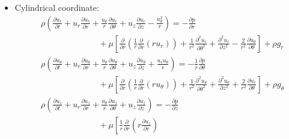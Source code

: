 \documentclass[../main.tex]{subfiles}
\begin{document}
\begin{itemize}
\begin{itemize}
\begin{align}
          \right) &= -\frac{\partial p}{\partial z} + \mu\left[
            \frac{\partial^2 u_z}{\partial x^2} + \frac{\partial^2 u_z}{\partial y^2} + \frac{\partial^2 u_z}{\partial z^2}
          \right] + \rho g_z
        \end{align}
      \item Cylindrical coordinate:
        \begin{align}
          &\rho\left(
            \frac{\partial u_r}{\partial t}  + u_r\frac{\partial u_r}{\partial r} + \frac{u_{\theta}}{r}\frac{\partial u_r}{\partial \theta} 
            + u_z\frac{\partial u_r}{\partial z} - \frac{u_{\theta}^2}{r}
          \right) = - \frac{\partial p}{\partial r} \nonumber\\
          &\phantom{\rho\left(\frac{\partial u_z}{\partial t}  + u_r\frac{\partial u_z}{\partial r}\right)} + \mu\left[
            \frac{\partial}{\partial r}\left(\frac{1}{r}\frac{\partial}{\partial r}\left(ru_r\right)\right)
            + \frac{1}{r^2}\frac{\partial^2 u_r}{\partial \theta^2} + \frac{\partial^2 u_r}{\partial z^2}
            -\frac{2}{r^2}\frac{\partial u_\theta}{\partial \theta}
          \right] + \rho g_r \\
          &\rho\left(
            \frac{\partial u_{\theta}}{\partial t}  + u_r\frac{\partial u_{\theta}}{\partial r} 
            + \frac{u_{\theta}}{r}\frac{\partial u_{\theta}}{\partial \theta} 
            + u_z\frac{\partial u_{\theta}}{\partial z} + \frac{u_r u_{\theta}}{r}
          \right) = - \frac{1}{r}\frac{\partial p}{\partial \theta} \nonumber\\
          &\phantom{\rho\left(\frac{\partial u_z}{\partial t}  + u_r\frac{\partial u_z}{\partial r}\right)} + \mu\left[
            \frac{\partial}{\partial r}\left(\frac{1}{r}\frac{\partial}{\partial r}\left(ru_{\theta}\right)\right)
            +\frac{1}{r^2}\frac{\partial^2 u_{\theta}}{\partial \theta^2} + \frac{\partial^2 u_{\theta}}{\partial z^2}
            +\frac{2}{r^2}\frac{\partial u_r}{\partial \theta}
          \right] + \rho g_{\theta} \\
          &\rho\left(
            \frac{\partial u_z}{\partial t}  + u_r\frac{\partial u_z}{\partial r} 
            + \frac{u_{\theta}}{r}\frac{\partial u_z}{\partial \theta} 
            + u_z\frac{\partial u_z}{\partial z}
          \right) = - \frac{\partial p}{\partial z} \nonumber\\
          &\phantom{\rho\left(\frac{\partial u_z}{\partial t}  + u_r\frac{\partial u_z}{\partial r}\right)} + \mu\left[
            \frac{1}{r}\frac{\partial}{\partial r}\left(r\frac{\partial u_z}{\partial r}\right)

\end{align}
\end{itemize}
\end{itemize}
\end{document}
